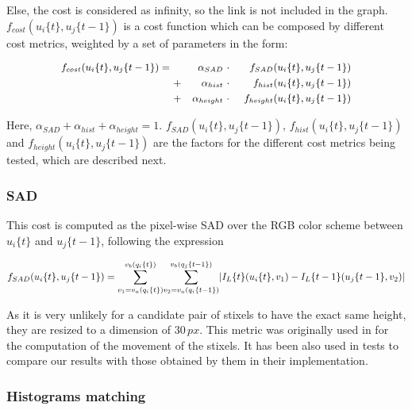 Else, the cost is considered as infinity, so the link is not included in the graph. $f_{cost}(u_i\{t\}, u_j\{t - 1\})$ is a cost function which can be composed by different cost metrics, weighted by a set of parameters in the form:

\begin{equation}\label{eq:cp04_cost_function}
\small
  \begin{align*}
  f_{cost}(u_i\{t\}, u_j\{t - 1\}) =~  & & \alpha_{SAD} & ~\cdot~ & f_{SAD}(u_i\{t\}, u_j\{t - 1\}) \\
      & + & \alpha_{hist} & ~\cdot~ & f_{hist}(u_i\{t\}, u_j\{t - 1\}) \\
      & + & \alpha_{height} & ~\cdot~ & f_{height}(u_i\{t\}, u_j\{t - 1\})
  \end{align*}
\end{equation}

Here, $\alpha_{SAD} + \alpha_{hist} + \alpha_{height} = 1$. $f_{SAD}(u_i\{t\}, u_j\{t - 1\})$, $f_{hist}(u_i\{t\}, u_j\{t - 1\})$ and $f_{height}(u_i\{t\}, u_j\{t - 1\})$ are the factors for the different cost metrics being tested, which are described next.

\subsubsection{\acf{SAD}}\label{ch:chapter04_01_03_01_01}

This cost is computed as the pixel-wise \acl{SAD} over the RGB color scheme between $u_i\{t\}$ and $u_j\{t - 1\}$, following the expression

\begin{equation}\label{eq:cp04_stixel_movement_sad_cost}
\tiny
f_{SAD}(u_i\{t\}, u_j\{t - 1\}) = 
\overset{v_b(q_i\{t\})}{\underset{v_1=v_a(q_i\{t\})}{\sum}}
\overset{v_b(q_j\{t - 1\})}{\underset{v_2=v_a(q_i\{t - 1\})}{\sum}}
| I_L\{t\}(u_i\{t\}, v_1) - I_L\{t - 1\}(u_j\{t - 1\}, v_2) |
\end{equation}

As it is very unlikely for a candidate pair of stixels to have the exact same height, they are resized to a dimension of $30\,px$. This metric was originally used in \cite{gunyel2012stixels} for the computation of the movement of the stixels. It has been also used in tests to compare our results with those obtained by them in their implementation.

\subsubsection{Histograms matching}\label{ch:chapter04_01_03_01_02}

